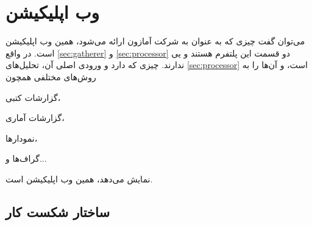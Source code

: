 \section{وب اپلیکیشن}\label{sec:web-app}
می‌توان گفت چیزی که به عنوان 
به شرکت آمازون ارائه می‌شود، همین وب ‌اپلیکیشن است.
در واقع 
\ref{sec:gatherer}
و
\ref{sec:processor}
دو قسمت 
این پلتفرم هستند و 
یی
ندارند. چیزی که 
دارد و ورودی اصلی آن، تحلیل‌های 
\ref{sec:processor}
است، و آن‌ها را به روش‌های مختلفی همچون
\begin{enumerate*}
\item 
گزارشات کتبی،
\item
گزارشات آماری،
\item 
نمودار‌ها،
\item 
گراف‌‌ها و...
\end{enumerate*}
نمایش می‌دهد، همین وب‌ اپلیکیشن است.

\subsection{ساختار شکست کار}
\begin{wbsbox}{}
\end{wbsbox}
